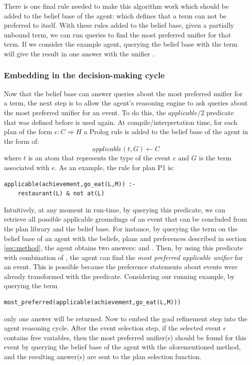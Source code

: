 There is one final rule needed to make this algorithm work which should be added to the belief base of the agent:  which defines that a term can not be preferred to itself. With these rules added to the belief base, given a partially unbound term, we can run queries to find the most preferred unifier for that term. If we consider the example agent, querying the belief base with the term  will give the result in one answer with the unifier . 

\subsubsection*{Embedding in the decision-making cycle}
Now that the belief base can answer queries about the most preferred unifier for a term, the next step is to allow the agent's reasoning engine to ask queries about the most preferred unifier for an event. To do this, the $applicable/2$ predicate that was defined before is used again. At compile/interpretation time, for each plan of the form $e : C \Rightarrow H$ a Prolog rule is added to the belief base of the agent in the form of:
\begin{equation*}
applicable(t,G) \leftarrow C
\end{equation*}
where $t$ is an atom that represents the type of the event $e$ and $G$ is the term associated with $e$. As an example, the rule for plan P1 is:
\begin{verbatim}
applicable(achievement,go_eat(L,M)) :-
    restaurant(L) & not at(L)
\end{verbatim}
Intuitively, at any moment in run-time, by querying this predicate, we can retrieve all possible applicable groundings of an event that can be concluded from the plan library and the belief base. For instance, by querying the term  
on the belief base of an agent with the beliefs, plans and preferences described in section \ref{sec:method}, the agent obtains two answers:  and . Then, by using this predicate with combination of , the agent can find the \textit{most preferred applicable unifier} for an event. This is possible because the preference statements about events were already transformed with the  predicate. Considering our running example, by querying the term 
\begin{verbatim}
most_preferred(applicable(achievement,go_eat(L,M)))
\end{verbatim}
only one answer  will be returned. Now to embed the goal refinement step into the agent reasoning cycle.
After the event selection step, if the selected event $\epsilon$ contains free variables, then the most preferred unifier(s) should be found for this event by querying the belief base of the agent with the aforementioned method, and the resulting answer(s) are sent to the plan selection function.


